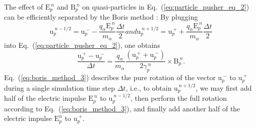 \documentclass[10pt, a4paper, twoside, openright]{report}
\renewcommand{\vec}[1]{\boldsymbol{\mathrm{#1}}}
\begin{document}
The effect of $ \vec{E}_{p}^{\:n} $ and $ \vec{B}_{p}^{\:n} $ on quasi-particles in Eq.~(\ref{eq:particle_pusher_eq_2}) can be efficiently separated by the Boris method \cite{Boris1970}: By plugging
\begin{subequations}
\begin{equation}\label{eq:boris_method_1}
	\vec{u}_{p}^{\:n-1/2} = \vec{u}_{p}^{\:-} - \frac{q_{\alpha} \vec{E}_{p}^{\:n}}{m_{\alpha}} \frac{\Delta t}{2}
\end{equation}
and
\begin{equation}\label{eq:boris_method_2}
	\vec{u}_{p}^{\:n+1/2} = \vec{u}_{p}^{\:+} + \frac{q_{\alpha} \vec{E}_{p}^{\:n}}{m_{\alpha}} \frac{\Delta t}{2}
\end{equation}
\end{subequations}
into Eq.~(\ref{eq:particle_pusher_eq_2}), one obtains
\begin{equation}\label{eq:boris_method_3}
	\frac{\vec{u}_{p}^{\:+} - \vec{u}_{p}^{\:-}}{\Delta t} = \frac{q_{\alpha}}{m_{\alpha}} \frac{\left( \vec{u}_{p}^{\:+} + \vec{u}_{p}^{\:-} \right)}{2 \gamma_p^{\:n} } \times \vec{B}_{p}^{\:n}. 
\end{equation}
Eq.~(\ref{eq:boris_method_3}) describes the pure rotation of the vector $ \vec{u}_{p}^{\:-} $ to $ \vec{u}_{p}^{\:+} $ during a single simulation time step $ \Delta t $, i.e., to obtain $ \vec{u}_{p}^{\:n+1/2} $, we may first add half of the electric impulse $ \vec{E}_{p}^{\:n} $ to $ \vec{u}_{p}^{\:n-1/2} $, then perform the full rotation according to Eq.~(\ref{eq:boris_method_3}), and finally add another half of the electric impulse $ \vec{E}_{p}^{n} $ to $ \vec{u}_{p}^{\:+} $.
\end{document}
